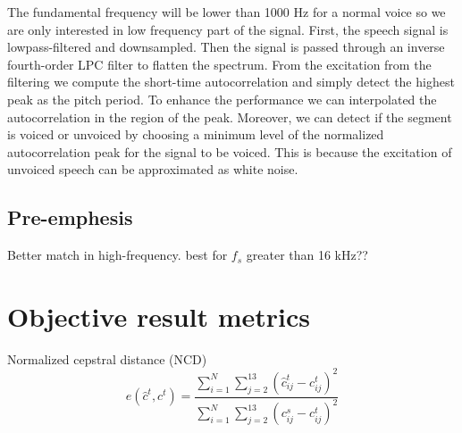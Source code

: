 The fundamental frequency will be lower than 1000 Hz for a normal voice so we are only interested in low frequency part of the signal. First, the speech signal is lowpass-filtered and downsampled. Then the signal is passed through an inverse fourth-order LPC filter to flatten the spectrum. From the excitation from the filtering we compute the short-time autocorrelation and simply detect the highest peak as the pitch period. To enhance the performance we can interpolated the autocorrelation in the region of the peak. Moreover, we can detect if the segment is voiced or unvoiced by choosing a minimum level of the normalized autocorrelation peak for the signal to be voiced. This is because the excitation of unvoiced speech can be approximated as white noise.


\subsection{Pre-emphesis} %
\label{sub:pre_emphesis}
Better match in high-frequency. best for $f_s$ greater than 16 kHz??

\section{Objective result metrics} %
\label{sec:objective_metrics}


\begin{definition}
	Normalized cepstral distance (NCD)
\begin{equation}
	e(\hat{c}^t,c^t) = \frac{\sum_{i=1}^{N}\sum_{j=2}^{13}(\hat{c}_{ij}^t-c_{ij}^t)^2}{\sum_{i=1}^{N}\sum_{j=2}^{13}(c_{ij}^s-c_{ij}^t)^2}
\end{equation}
\end{definition}


